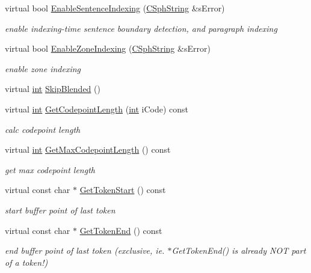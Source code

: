 \begin{DoxyCompactItemize}
virtual bool \hyperlink{classCSphTokenFilter_ae262f2361ccaac20e781ba77fb35035e}{Enable\-Sentence\-Indexing} (\hyperlink{structCSphString}{C\-Sph\-String} \&s\-Error)
\begin{DoxyCompactList}\small\item\em enable indexing-\/time sentence boundary detection, and paragraph indexing \end{DoxyCompactList}\item 
virtual bool \hyperlink{classCSphTokenFilter_a9db79116d0276391c121846b60451177}{Enable\-Zone\-Indexing} (\hyperlink{structCSphString}{C\-Sph\-String} \&s\-Error)
\begin{DoxyCompactList}\small\item\em enable zone indexing \end{DoxyCompactList}\item 
virtual \hyperlink{sphinxexpr_8cpp_a4a26e8f9cb8b736e0c4cbf4d16de985e}{int} \hyperlink{classCSphTokenFilter_adaa7f4d01631e3c83b46d11cb3b762cf}{Skip\-Blended} ()
\item 
virtual \hyperlink{sphinxexpr_8cpp_a4a26e8f9cb8b736e0c4cbf4d16de985e}{int} \hyperlink{classCSphTokenFilter_ab48c70e1bc31a8d54db8609b3680d1ce}{Get\-Codepoint\-Length} (\hyperlink{sphinxexpr_8cpp_a4a26e8f9cb8b736e0c4cbf4d16de985e}{int} i\-Code) const 
\begin{DoxyCompactList}\small\item\em calc codepoint length \end{DoxyCompactList}\item 
virtual \hyperlink{sphinxexpr_8cpp_a4a26e8f9cb8b736e0c4cbf4d16de985e}{int} \hyperlink{classCSphTokenFilter_a2025f7fda6958fe2cd3deccf711c6339}{Get\-Max\-Codepoint\-Length} () const 
\begin{DoxyCompactList}\small\item\em get max codepoint length \end{DoxyCompactList}\item 
virtual const char $\ast$ \hyperlink{classCSphTokenFilter_a4015a97035aac64274083d0ef63703d8}{Get\-Token\-Start} () const 
\begin{DoxyCompactList}\small\item\em start buffer point of last token \end{DoxyCompactList}\item 
virtual const char $\ast$ \hyperlink{classCSphTokenFilter_a15835b02e959bfe38bfed92d4649de97}{Get\-Token\-End} () const 
\begin{DoxyCompactList}\small\item\em end buffer point of last token (exclusive, ie. $\ast$\-Get\-Token\-End() is already N\-O\-T part of a token!) \end{DoxyCompactList}\item 

\end{DoxyCompactItemize}
